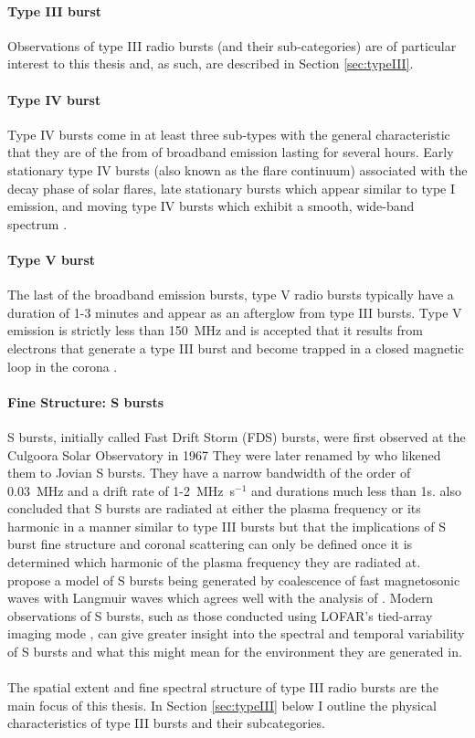 \paragraph{Type III burst}
Observations of type III radio bursts (and their sub-categories) are of particular interest to this thesis and, as such, are described in Section \ref{sec:typeIII}.
\paragraph{Type IV burst}
Type IV bursts come in at least three sub-types with the general characteristic that they are of the from of broadband emission lasting for several hours. Early stationary type IV bursts (also known as the flare continuum) associated with the decay phase of solar flares, late stationary bursts which appear similar to type I emission, and moving type IV bursts which exhibit a smooth, wide-band spectrum \citep{McLean1985}.
\paragraph{Type V burst}
The last of the broadband emission bursts, type V radio bursts typically have a duration of 1-3 minutes and appear as an afterglow from type III bursts. Type V emission is strictly less than 150~MHz and is accepted that it results from electrons that generate a type III burst and become trapped in a closed magnetic loop in the corona \citep{McLean1985}.

\paragraph{Fine Structure: S bursts} 
S bursts, initially called Fast Drift Storm (FDS) bursts, were first observed at the Culgoora Solar Observatory in 1967 \citep{Ellis1969} They were later renamed by \cite{McConnell1980} who likened them to Jovian S bursts. They have a narrow bandwidth of the order of 0.03~MHz and a drift rate of 1-2~MHz~s$^{-1}$ and durations much less than 1s. \cite{McConnell1980} also concluded that S bursts are radiated at either the plasma frequency or its harmonic in a manner similar to type III bursts but that the implications of S burst fine structure and coronal scattering can only be defined once it is determined which harmonic of the plasma frequency they are radiated at. \cite{Melnik2010} propose a model of S bursts being generated by coalescence of fast magnetosonic waves with Langmuir waves which agrees well with the analysis of \cite{Clarke2019}. Modern observations of S bursts, such as those conducted using LOFAR's tied-array imaging mode \citep{Morosan2015}, can give greater insight into the spectral and temporal variability of S bursts and what this might mean for the environment they are generated in.
\\
\\The spatial extent and fine spectral structure of type III radio bursts are the main focus of this thesis. In Section \ref{sec:typeIII} below I outline the physical characteristics of type III bursts and their subcategories.

